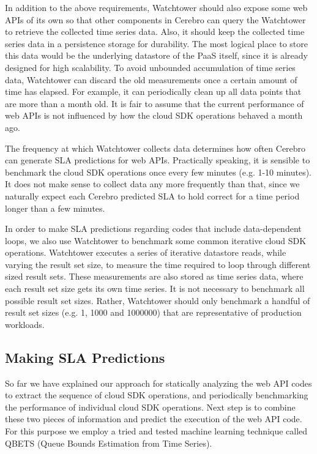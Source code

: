 In addition to the above requirements, Watchtower should also expose some web APIs of its own 
so that other components in Cerebro can query the Watchtower to retrieve the collected time series data. Also,
it should keep the collected time series data in a persistence storage for durability. The most logical
place to store this data would be the underlying datastore of the PaaS itself, since it is already designed
for high scalability. To avoid unbounded accumulation of time series data, Watchtower can discard the old
measurements once a certain amount of time has elapsed. For example, it can periodically clean up
all data points that are more than a month old. It is fair to assume that the current performance of web APIs
is not influenced by how the cloud SDK operations behaved a month ago. 

The frequency at which
Watchtower collects data determines how often Cerebro can generate SLA predictions for web APIs. Practically
speaking, it is sensible to benchmark the cloud SDK operations once every few minutes (e.g. 1-10 minutes). It does not make
sense to collect data any more frequently than that, since we naturally expect each Cerebro predicted SLA to 
hold correct for a time period longer than a few minutes.

In order to make SLA predictions regarding codes that include data-dependent loops, we also use Watchtower
to benchmark some common iterative cloud SDK operations. 
Watchtower executes a series of iterative datastore reads,
while varying the result set size, to measure the time required to loop through different sized result sets. These
measurements are also stored as time series data, where each result set size gets its own time series. 
It is not necessary to benchmark all possible result set sizes. Rather, Watchtower should only benchmark a
handful of result set sizes  (e.g. 1, 1000 and 1000000) that are representative of production workloads.

\subsection{Making SLA Predictions}
So far we have explained our approach for statically analyzing the web API codes to extract the sequence
of cloud SDK operations, and periodically benchmarking the performance of individual cloud SDK
operations. Next step is to combine these two pieces of information and predict the execution of the
web API code. For this purpose we employ a tried and tested machine learning technique called
QBETS (Queue Bounds Estimation from Time Series). 

